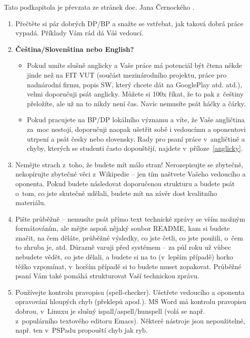 Tato podkapitola je převzata ze stránek doc. Jana Černockého \cite{Cernocky}.

\begin{enumerate}
  \item{Přečtěte si pár dobrých DP/BP a snažte se vstřebat, jak taková dobrá práce vypadá. Příklady Vám rád dá Váš vedoucí.}
  \item{\textbf{Čeština/Slovenština nebo English?}
    \begin{itemize}
      \item Pokud umíte slušně anglicky a Vaše práce má potenciál být čtena někde jinde než na FIT VUT (součást mezinárodního projektu, práce pro nadnárodní firmu, popis SW, který chcete dát na GooglePlay atd. atd.), velmi doporučuji psát anglicky. Můžete si 100x říkat, že to pak z~češtiny přeložíte, ale už na to nikdy není čas. Navíc nemusíte psát háčky a čárky.
      \item  Pokud pracujete na BP/DP lokálního významu a víte, že Vaše angličtina za~moc nestojí, doporučuji naopak ušetřit sobě i vedoucímu a oponentovi utrpení a psát česky nebo slovensky. Rady pro psaní práce v~angličtině a chyby, kterých se studenti často dopouštějí, najdete v~příloze~\ref{anglicky}. 
    \end{itemize}}
  \item{Nemějte strach z~toho, že budete mít málo stran! Nerozepisujte se zbytečně, nekopírujte zbytečné věci z~Wikipedie -- jen tím naštvete Vašeho vedoucího a oponenta. Pokud budete následovat doporučenou strukturu a budete psát o~tom, co jste skutečně udělali, budete mít na závěr dost kvalitního materiálu. }
  \item{Pište průběžně -- nemusíte psát přímo text technické zprávy se vším možným formátováním, ale mějte aspoň nějaký soubor README, kam si budete značit, na čem děláte, průběžné výsledky, co jste četli, co jste použili, o~čem to zhruba je, atd. Důrazně varuji před systémem  -- za půl roku už vůbec nebudete vědět, co jste dělali, a budete si na to (v~lepším případě) horko těžko vzpomínat, v~horším případě si to budete muset zopakovat. Průběžné psaní Vám také pomáhá strukturovat Vaší technickou zprávu.}
  \item{Používejte kontrolu pravopisu (spell-checker). Ušetřete vedoucího a oponenta opravování hloupých chyb (překlepů apod.). MS Word má kontrolu pravopisu dobrou, v~Linuxu je slušný ispall/aspell/hunspell (volá se např. z~populárního textového editoru Emacs). Některé nástroje jsou nepoužitelné, např. ten v~PSPadu propouští chyb jak ryb.}

\end{enumerate}
